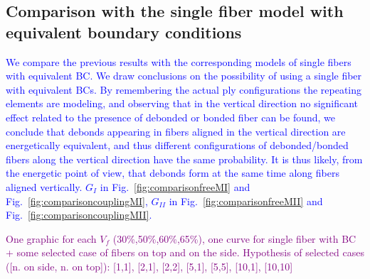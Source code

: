 \documentclass[review]{elsarticle}
\begin{document}
\subsection{Comparison with the single fiber model with equivalent boundary conditions}

\textcolor{blue}{We compare the previous results with the corresponding models of single fibers with equivalent BC. We draw conclusions on the possibility of using a single fiber with equivalent BCs. By remembering the actual ply configurations the repeating elements are modeling, and observing that in the vertical direction no significant effect related to the presence of debonded or bonded fiber can be found, we conclude that debonds appearing in fibers aligned in the vertical direction are energetically equivalent, and thus different configurations of debonded/bonded fibers along the vertical direction have the same probability. It is thus likely, from the energetic point of view, that debonds form at the same time along fibers aligned vertically.  $G_{I}$ in Fig.~\ref{fig:comparisonfreeMI} and Fig.~\ref{fig:comparisoncouplingMI}, $G_{II}$ in Fig.~\ref{fig:comparisonfreeMII} and Fig.~\ref{fig:comparisoncouplingMII}.}

\textcolor{purple}{One graphic for each $V_{f}$ (30\%,50\%,60\%,65\%), one curve for single fiber with BC + some selected case of fibers on top and on the side. Hypothesis of selected cases ([n. on side, n. on top]): [1,1], [2,1], [2,2], [5,1], [5,5], [10,1], [10,10]}\\
\end{document}
